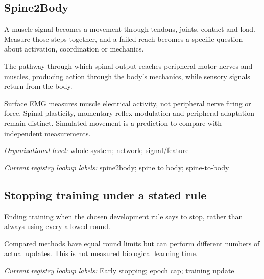 \begin{samepage}
\subsection*{Spine2Body}
\noindent A muscle signal becomes a movement through tendons, joints, contact and load. Measure those steps together, and a failed reach becomes a specific question about activation, coordination or mechanics.\par
\end{samepage}
\noindent The pathway through which spinal output reaches peripheral motor nerves and muscles, producing action through the body's mechanics, while sensory signals return from the body.\par
\noindent Surface EMG measures muscle electrical activity, not peripheral nerve firing or force. Spinal plasticity, momentary reflex modulation and peripheral adaptation remain distinct. Simulated movement is a prediction to compare with independent measurements.\par
\begin{samepage}
\noindent\textit{Organizational level:} whole system; network; signal/feature\par\nopagebreak[4]

\end{samepage}


\noindent\textit{Current registry lookup labels:} spine2body; spine to body; spine-to-body\par

\begin{samepage}
\subsection*{Stopping training under a stated rule}
\noindent Ending training when the chosen development rule says to stop, rather than always using every allowed round.\par
\end{samepage}
\begin{samepage}
\noindent Compared methods have equal round limits but can perform different numbers of actual updates. This is not measured biological learning time.\par\nopagebreak[4]

\end{samepage}


\noindent\textit{Current registry lookup labels:} Early stopping; epoch cap; training update\par


